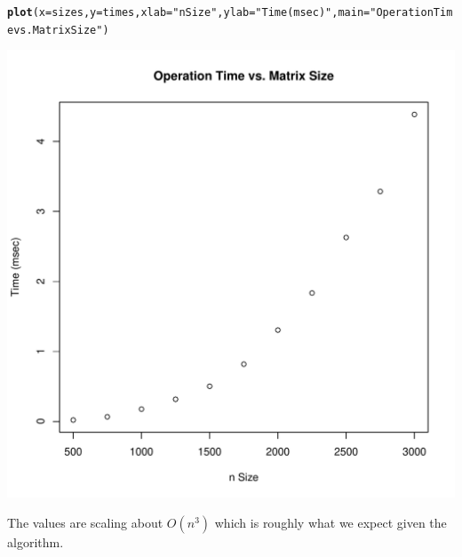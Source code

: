 \documentclass{article}\usepackage[]{graphicx}\usepackage[]{color}
\makeatletter
\def\maxwidth{ %
  \ifdim\Gin@nat@width>\linewidth
    \linewidth
  \else
    \Gin@nat@width
  \fi
}
\newcommand{\hlstr}[1]{\textcolor[rgb]{0.192,0.494,0.8}{#1}}%
\newcommand{\hlstd}[1]{\textcolor[rgb]{0.345,0.345,0.345}{#1}}%
\newcommand{\hlkwc}[1]{\textcolor[rgb]{0.333,0.667,0.333}{#1}}%
\newcommand{\hlkwd}[1]{\textcolor[rgb]{0.737,0.353,0.396}{\textbf{#1}}}%
\newenvironment{kframe}{%
 \def\at@end@of@kframe{}%
 \ifinner\ifhmode%
  \def\at@end@of@kframe{\end{minipage}}%
  \begin{minipage}{\columnwidth}%
 \fi\fi%
 \def\FrameCommand##1{\hskip\@totalleftmargin \hskip-\fboxsep
 \colorbox{shadecolor}{##1}\hskip-\fboxsep
     \hskip-\linewidth \hskip-\@totalleftmargin \hskip\columnwidth}%
 \MakeFramed {\advance\hsize-\width
   \@totalleftmargin\z@ \linewidth\hsize
   \@setminipage}}%
 {\par\unskip\endMakeFramed%
 \at@end@of@kframe}
\newenvironment{knitrout}{}{} %
\makeatother
\begin{document}
\begin{knitrout}
\begin{kframe}\begin{alltt}
\hlkwd{plot}\hlstd{(}\hlkwc{x}\hlstd{=sizes,}\hlkwc{y}\hlstd{=times,}\hlkwc{xlab}\hlstd{=}\hlstr{"n Size"}\hlstd{,}\hlkwc{ylab}\hlstd{=}\hlstr{"Time (msec)"}\hlstd{,}\hlkwc{main}\hlstd{=}\hlstr{"Operation Time vs. Matrix Size"}\hlstd{)}
\end{alltt}
\end{kframe}
\includegraphics[width=\maxwidth]{figure/unnamed-chunk-1-2} 

\end{knitrout}

The values are scaling about \(O(n^3)\) which is roughly what we expect given the algorithm.

\section{}
\end{document}
